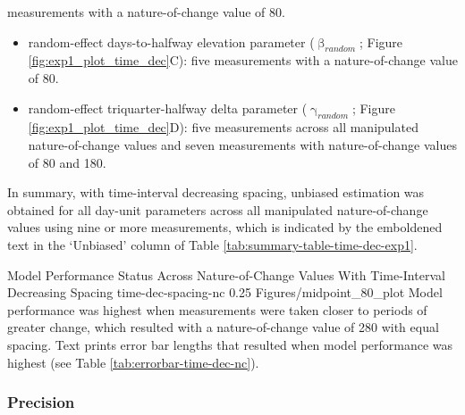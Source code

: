 \documentclass[
12pt, %
twoside,
english]{guelphthesis}
\begin{document}
measurements with a nature-of-change value of 80.
\begin{itemize}
\tightlist
\item
  random-effect days-to-halfway elevation parameter (\(\upbeta_{random}\); Figure \ref{fig:exp1_plot_time_dec}C): five measurements with a nature-of-change value of 80.
\item
  random-effect triquarter-halfway delta parameter (\(\upgamma_{random}\); Figure \ref{fig:exp1_plot_time_dec}D): five measurements across all manipulated nature-of-change values and seven measurements with nature-of-change values of 80 and 180.
\end{itemize}
In summary, with time-interval decreasing spacing, unbiased estimation was obtained for all day-unit parameters across all manipulated nature-of-change values using nine or more measurements, which is indicated by the emboldened text in the `Unbiased' column of Table \ref{tab:summary-table-time-dec-exp1}.
\begin{apaFigure}
[portrait]
[samepage]
[0cm]
{Model Performance Status Across Nature-of-Change Values With Time-Interval Decreasing Spacing}
{time-dec-spacing-nc}
{0.25}
{Figures/midpoint_80_plot}
{Model performance was highest when measurements were taken closer to periods of greater change, which resulted with a nature-of-change value of 280 with equal spacing. Text prints error bar lengths that resulted when model performance was highest (see Table \ref{tab:errorbar-time-dec-nc}).}
\end{apaFigure}
\hypertarget{precision-time-dec-exp1}{%
\subsubsection{Precision}\label{precision-time-dec-exp1}}
\end{document}
